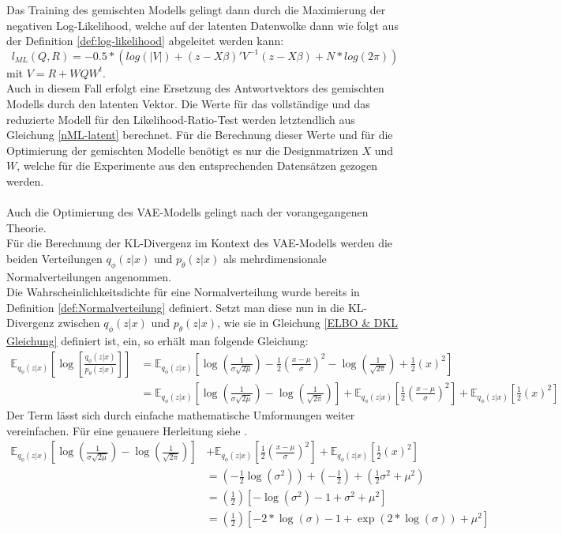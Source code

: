 \documentclass[%
thesis=student,%
coverpage=false,%
titlepage=false,%
headmarks=true, %
german,%
font=libertine, %
math=newpxtx, %
BCOR=5mm,%
coverBCOR=11mm%
]{tumbook}
\theoremstyle{break}
\begin{document}
Das Training des gemischten Modells gelingt dann durch die Maximierung der negativen Log-Likelihood, welche auf der latenten Datenwolke dann wie folgt aus der Definition \ref{def:log-likelihood} abgeleitet werden kann:
$$ l_{ML}(Q,R) = -0.5 * (log(|V|)+ (z-X\beta)'V^{-1}(z-X\beta) + N * log(2\pi))$$\label{nML-latent}
mit $V= R + WQW^t$.\\
Auch in diesem Fall erfolgt eine Ersetzung des Antwortvektors des gemischten Modells durch den latenten Vektor.
Die Werte für das vollständige und das reduzierte Modell für den Likelihood-Ratio-Test werden letztendlich aus Gleichung \ref{nML-latent} berechnet. Für die Berechnung dieser Werte und für die Optimierung der gemischten Modelle benötigt es nur die Designmatrizen $X$ und $W$, welche für die Experimente aus den entsprechenden Datensätzen gezogen werden.\\
\\
Auch die Optimierung des VAE-Modells gelingt nach der vorangegangenen Theorie. \\
Für die Berechnung der KL-Divergenz im Kontext des VAE-Modells werden die beiden Verteilungen $q_\phi(z|x)$ und $p_\theta(z|x)$ als mehrdimensionale Normalverteilungen angenommen. \\
Die Wahrscheinlichkeitsdichte für eine Normalverteilung wurde bereits in Definition \ref{def:Normalverteilung} definiert. Setzt man diese nun in die KL-Divergenz zwischen $q_\phi(z|x)$ und $p_\theta(z|x)$, wie sie in Gleichung \ref{ELBO & DKL Gleichung} definiert ist, ein, so erhält man folgende Gleichung:
\begin{align}
	\mathbb{E}_{q_\phi(z|x)}\left[\log\left[ \frac{q_\phi(z|x)}{p_\theta(z|x)}\right]\right] &=\mathbb{E}_{q_\phi(z|x)}\left[\log\left(\frac{1}{\sigma\sqrt{2\mu}}\right)- \frac{1}{2}\left(\frac{x-\mu}{\sigma}\right)^2 - \log\left(\frac{1}{\sqrt{2\pi}}\right)+ \frac{1}{2}(x)^2\right] \\
	&=\mathbb{E}_{q_\phi(z|x)}\left[\log\left(\frac{1}{\sigma\sqrt{2\mu}}\right) - \log\left(\frac{1}{\sqrt{2\pi}}\right)\right] + \mathbb{E}_{q_\phi(z|x)}\left[ \frac{1}{2}\left(\frac{x-\mu}{\sigma}\right)^2\right] + \mathbb{E}_{q_\phi(z|x)}\left[\frac{1}{2}(x)^2\right] 
\end{align}
Der Term lässt sich durch einfache mathematische Umformungen weiter vereinfachen. Für eine genauere Herleitung siehe \cite{KL-Div}.
\begin{align}
	\mathbb{E}_{q_\phi(z|x)}\left[\log\left(\frac{1}{\sigma\sqrt{2\mu}}\right) - \log\left(\frac{1}{\sqrt{2\pi}}\right)\right] &+ \mathbb{E}_{q_\phi(z|x)}\left[ \frac{1}{2}\left(\frac{x-\mu}{\sigma}\right)^2\right] + \mathbb{E}_{q_\phi(z|x)}\left[\frac{1}{2}(x)^2\right] \\
	&= (-\frac{1}{2}\log(\sigma^2)) + (-\frac{1}{2}) + (\frac{1}{2}\sigma^2 + \mu^2) \\
	&= (\frac{1}{2})[-\log(\sigma^2)-1+\sigma^2+\mu^2] \\
	&= (\frac{1}{2})[-2*\log(\sigma)-1+ \exp(2* \log(\sigma))+\mu^2]
\end{align}
\end{document}
